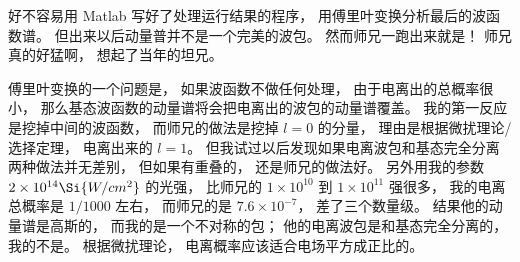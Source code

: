 好不容易用 Matlab 写好了处理运行结果的程序， 用傅里叶变换分析最后的波函数谱。 但出来以后动量普并不是一个完美的波包。 然而师兄一跑出来就是！ 师兄真的好猛啊， 想起了当年的坦兄。

傅里叶变换的一个问题是， 如果波函数不做任何处理， 由于电离出的总概率很小， 那么基态波函数的动量谱将会把电离出的波包的动量谱覆盖。 我的第一反应是挖掉中间的波函数， 而师兄的做法是挖掉 $l = 0$ 的分量， 理由是根据微扰理论/选择定理， 电离出来的 $l = 1$。 但我试过以后发现如果电离波包和基态完全分离两种做法并无差别， 但如果有重叠的， 还是师兄的做法好。 另外用我的参数 $2\times 10^{14} \Si{W/cm^2}$ 的光强， 比师兄的 $1\times 10^{10}$ 到 $1\times 10^{11}$ 强很多， 我的电离总概率是 $1/1000$ 左右， 而师兄的是 $7.6\times 10^{-7}$， 差了三个数量级。 结果他的动量谱是高斯的， 而我的是一个不对称的包； 他的电离波包是和基态完全分离的， 我的不是。 根据微扰理论， 电离概率应该适合电场平方成正比的。
